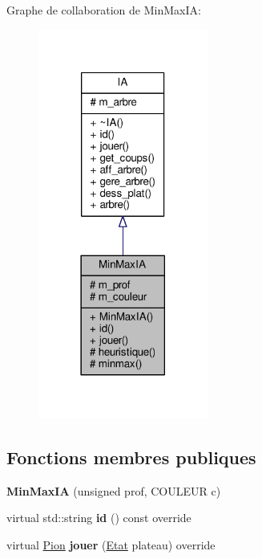 Graphe de collaboration de Min\+Max\+IA\+:\nopagebreak
\begin{figure}[H]
\begin{center}
\leavevmode
\includegraphics[width=158pt]{classMinMaxIA__coll__graph}
\end{center}
\end{figure}
\subsection*{Fonctions membres publiques}
\begin{DoxyCompactItemize}
\item 
{\bfseries Min\+Max\+IA} (unsigned prof, C\+O\+U\+L\+E\+UR c)\hypertarget{classMinMaxIA_ab186638b8bf69698b86415555734a926}{}\label{classMinMaxIA_ab186638b8bf69698b86415555734a926}

\item 
virtual std\+::string {\bfseries id} () const override\hypertarget{classMinMaxIA_ace6db5b6ab7a0aaba72d2bf16a44f6f3}{}\label{classMinMaxIA_ace6db5b6ab7a0aaba72d2bf16a44f6f3}

\item 
virtual \hyperlink{structPion}{Pion} {\bfseries jouer} (\hyperlink{structEtat}{Etat} plateau) override\hypertarget{classMinMaxIA_a829500a59568c81e902862933e4f9931}{}\label{classMinMaxIA_a829500a59568c81e902862933e4f9931}

\end{DoxyCompactItemize}
